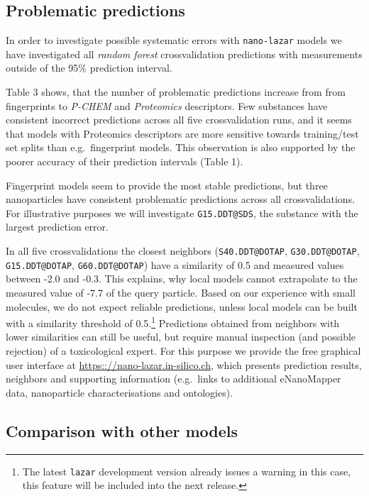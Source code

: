 \documentclass[utf8]{frontiersHLTH} %
\begin{document}
\subsection{Problematic predictions}\label{problematic-predictions}

In order to investigate possible systematic errors with
\texttt{nano-lazar} models we have investigated all \emph{random forest}
crossvalidation predictions with measurements outside of the 95\%
prediction interval.

Table 3 shows, that the number of problematic predictions increase from
from fingerprints to \emph{P-CHEM} and \emph{Proteomics} descriptors.
Few substances have consistent incorrect predictions across all five
crossvalidation runs, and it seems that models with Proteomics
descriptors are more sensitive towards training/test set splits than
e.g.~fingerprint models. This observation is also supported by the
poorer accuracy of their prediction intervals (Table 1).

Fingerprint models seem to provide the most stable predictions, but
three nanoparticles have consistent problematic predictions across all
crossvalidations. For illustrative purposes we will investigate
\texttt{G15.DDT@SDS}, the substance with the largest prediction error.

In all five crossvalidations the closest neighbors
(\texttt{S40.DDT@DOTAP}, \texttt{G30.DDT@DOTAP}, \texttt{G15.DDT@DOTAP},
\texttt{G60.DDT@DOTAP}) have a similarity of 0.5 and measured values
between -2.0 and -0.3. This explains, why local models cannot
extrapolate to the measured value of -7.7 of the query particle. Based
on our experience with small molecules, we do not expect reliable
predictions, unless local models can be built with a similarity
threshold of 0.5.\footnote{The latest \texttt{lazar} development version
  already issues a warning in this case, this feature will be included
  into the next release.} Predictions obtained from neighbors with lower
similarities can still be useful, but require manual inspection (and
possible rejection) of a toxicological expert. For this purpose we
provide the free graphical user interface at
\url{https:://nano-lazar.in-silico.ch}, which presents prediction
results, neighbors and supporting information (e.g.~links to additional
eNanoMapper data, nanoparticle characterisations and ontologies).

\subsection{Comparison with other
models}\label{comparison-with-other-models}
\end{document}

